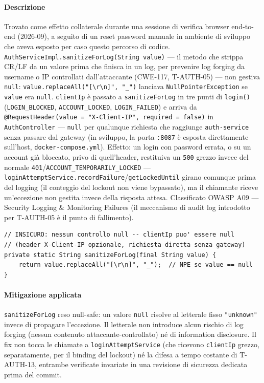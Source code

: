 ﻿\documentclass[a4paper,12pt]{report}
\begin{document}
\paragraph{Descrizione}
Trovato come effetto collaterale durante una sessione di verifica browser
end-to-end (2026-09), a seguito di un reset password manuale in ambiente
di sviluppo che aveva esposto per caso questo percorso di codice.
\texttt{AuthServiceImpl.sanitizeForLog(String value)} --- il metodo che
strippa CR/LF da un valore prima che finisca in un log, per prevenire
log forging da username o IP controllati dall'attaccante (CWE-117,
T-AUTH-05) --- non gestiva \texttt{null}:
\texttt{value.replaceAll("[\textbackslash r\textbackslash n]", "\_")} lanciava
\texttt{NullPointerException} se \texttt{value} era \texttt{null}.
\texttt{clientIp} è passato a \texttt{sanitizeForLog} in tre punti di
\texttt{login()} (\texttt{LOGIN\_BLOCKED}, \texttt{ACCOUNT\_LOCKED},
\texttt{LOGIN\_FAILED}) e arriva da
\texttt{@RequestHeader(value = "X-Client-IP", required = false)} in
\texttt{AuthController} --- \texttt{null} per qualunque richiesta che
raggiunge \texttt{auth-service} senza passare dal gateway (in sviluppo,
la porta \texttt{:8087} è esposta direttamente sull'host,
\texttt{docker-compose.yml}). Effetto: un login con password errata, o
su un account già bloccato, privo di quell'header, restituiva un
\texttt{500} grezzo invece del normale \texttt{401}/\texttt{ACCOUNT\_TEMPORARILY\_LOCKED}
--- \texttt{loginAttemptService.recordFailure}/\texttt{getLockedUntil}
girano comunque prima del logging (il conteggio del lockout non viene
bypassato), ma il chiamante riceve un'eccezione non gestita invece della
risposta attesa. Classificato OWASP A09 --- Security Logging \&
Monitoring Failures (il meccanismo di audit log introdotto per T-AUTH-05
è il punto di fallimento).

\begin{insecurebox}[title={Codice Vulnerabile --- AuthServiceImpl.java (baseline)}]
\begin{lstlisting}[style=java]
// INSICURO: nessun controllo null -- clientIp puo' essere null
// (header X-Client-IP opzionale, richiesta diretta senza gateway)
private static String sanitizeForLog(final String value) {
    return value.replaceAll("[\r\n]", "_");  // NPE se value == null
}
\end{lstlisting}
\end{insecurebox}

\paragraph{Mitigazione applicata}
\texttt{sanitizeForLog} reso null-safe: un valore \texttt{null} risolve al
letterale fisso \texttt{"unknown"} invece di propagare l'eccezione. Il
letterale non introduce alcun rischio di log forging (nessun contenuto
attaccante-controllato) né di information disclosure. Il fix non tocca
le chiamate a \texttt{loginAttemptService} (che ricevono \texttt{clientIp}
grezzo, separatamente, per il binding del lockout) né la difesa a tempo
costante di T-AUTH-13, entrambe verificate invariate in una revisione di
sicurezza dedicata prima del commit.
\end{document}
